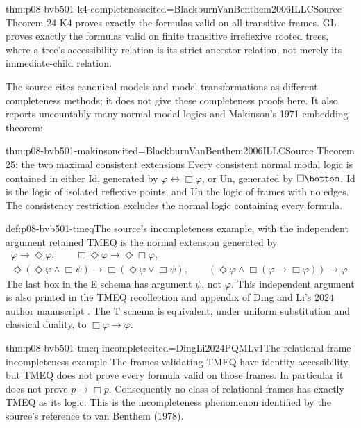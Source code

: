 \begin{hbtheorem}{thm:p08-bvb501-k4-completeness}{cited=BlackburnVanBenthem2006ILLC}{Source Theorem 24}
K4 proves exactly the formulas valid on all transitive frames. GL proves
exactly the formulas valid on finite transitive irreflexive rooted trees,
where a tree's accessibility relation is its strict ancestor relation,
not merely its immediate-child relation.
\end{hbtheorem}

The source cites canonical models and model transformations as different
completeness methods; it does not give these completeness proofs here.
It also reports uncountably many normal modal logics and Makinson's
1971 embedding theorem:

\begin{hbtheorem}{thm:p08-bvb501-makinson}{cited=BlackburnVanBenthem2006ILLC}{Source Theorem 25: the two maximal consistent extensions}
Every consistent normal modal logic is contained in either Id, generated
by \(\varphi\leftrightarrow\Box\varphi\), or Un, generated
by \(\Box\bottom\). Id is the logic of isolated reflexive points,
and Un the logic of frames with no edges. The consistency restriction
excludes the normal logic containing every formula.
\end{hbtheorem}

\begin{hbdefinition}{def:p08-bvb501-tmeq}{The source's incompleteness example, with the independent argument retained}
TMEQ is the normal extension generated by
\[
 \begin{gathered}
 \varphi\to\Diamond\varphi,\qquad
 \Box\Diamond\varphi\to\Diamond\Box\varphi,\\
 \Diamond(\Diamond\varphi\land\Box\psi)
    \to\Box(\Diamond\varphi\lor\Box\psi),\qquad
 (\Diamond\varphi\land\Box(\varphi\to\Box\varphi))\to\varphi.
 \end{gathered}
\]
The last box in the E schema has argument \(\psi\), not
\(\varphi\). This independent argument is also printed in the
TMEQ recollection and appendix of Ding and Li's 2024 author manuscript
\cite{DingLi2024PQMLv1}. The T schema is equivalent, under uniform
substitution and classical duality, to \(\Box\varphi\to\varphi\).
\end{hbdefinition}

\begin{hbtheorem}{thm:p08-bvb501-tmeq-incomplete}{cited=DingLi2024PQMLv1}{The relational-frame incompleteness example}
The frames validating TMEQ have identity accessibility, but TMEQ does
not prove every formula valid on those frames. In particular it does
not prove \(p\to\Box p\). Consequently no class of relational
frames has exactly TMEQ as its logic. This is the incompleteness
phenomenon identified by the source's reference to van Benthem (1978).
\end{hbtheorem}

